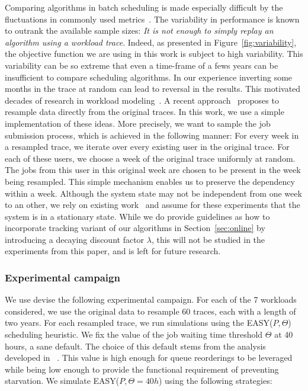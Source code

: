 \documentclass[sigconf,anonymous]{acmart}
\begin{document}
Comparing algorithms in batch scheduling is made especially difficult by the
fluctuations in commonly used metrics~\cite{jsm}. The variability in
performance is known to outrank the available sample sizes: \textit{It is not
enough to simply replay an algorithm using a workload trace}. Indeed, as
presented in Figure~\ref{fig:variability}, the objective function we are using
in this work is subject to high variability. This variability can be so extreme
that even a time-frame of a fews years can be insufficient to compare scheduling
algorithms. In our experience inverting some months in the trace at random can
lead to reversal in the results. This motivated decades of research in workload
modeling~\cite{feitbook}. A recent approach~\cite{feitresampling} proposes to
resample data directly from the original traces. In this work, we use a simple
implementation of these ideas.  More precisely, we want to sample the job
submission process, which is achieved in the following manner: For every week in
a resampled trace, we iterate over every existing user in the original trace.
For each of these users, we choose a week of the original trace uniformly at
random. The jobs from this user in this original week are chosen to be present
in the week being resampled.  This simple mechanism enables us to preserve the
dependency within a week.  Although the system state may not be independent
from one week to an other, we rely on existing work~\cite{jsspp17} and assume
for these experiments that the system is in a stationary state. While we
do provide guidelines as how to incorporate tracking variant of our algorithms
in Section~\ref{sec:online} by introducing a decaying discount factor $\lambda$,
this will not be studied in the experiments from this paper, and is left for
future research.


\subsubsection{Experimental campaign}

We use devise the following experimental campaign. For each of the 7 workloads
considered, we use the original data to resample 60 traces, each with a length
of two years. For each resampled trace, we run simulations using the
EASY($P,\Theta$) scheduling heuristic. We fix the value of the job waiting time
threshold $\Theta$ at 40 hours, a sane default. The choice of this default
stems from the analysis developed in ~\cite{jsspp17}. This value is high
enough for queue reorderings to be leveraged while being low enough to provide
the functional requirement of preventing starvation. We simulate
EASY($P,\Theta=40h$) using the following strategies:
\end{document}
